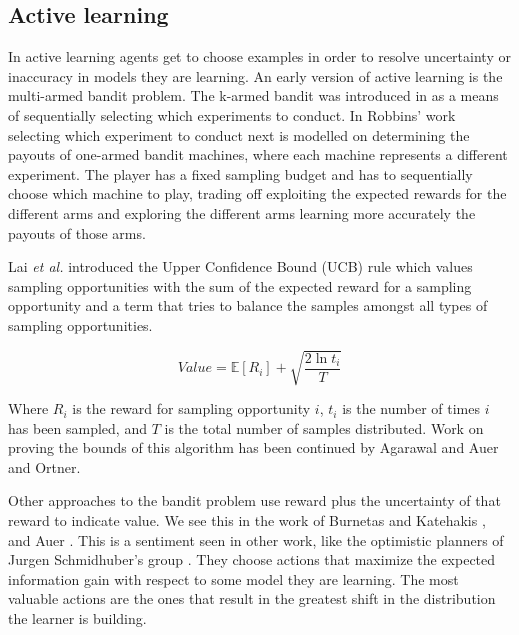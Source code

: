 \subsection{Active learning}

In active learning agents get to choose examples in order to resolve
uncertainty or inaccuracy in models they are learning.  An early version of
active learning is the multi-armed bandit problem.  The k-armed bandit was
introduced in \cite{robbins1952some} as a means of sequentially selecting which
experiments to conduct.  In Robbins' work \cite{robbins1952some} selecting which
experiment to conduct next is modelled on determining the payouts of one-armed
bandit machines, where each machine represents a different experiment.  The
player has a fixed sampling budget and has to sequentially choose which machine
to play, trading off exploiting the expected rewards for the different arms and
exploring the different arms learning more accurately the payouts of those
arms.  

Lai \emph{et al.} \cite{lai1985asymptotically} introduced the Upper Confidence
Bound (UCB) rule which values sampling opportunities with the sum of the expected reward for a sampling opportunity and a term that tries to balance the samples amongst all types of sampling opportunities.

$$
Value = \mathbb{E}\left[R_i\right] + \sqrt{\frac{2\ln t_i}{T}}
$$

Where $R_i$ is the reward for sampling opportunity $i$, $t_i$ is the number of times $i$ has been sampled, and $T$ is the total number of samples distributed.  Work on proving the bounds of this algorithm has been continued by Agarawal \cite{agrawal1995sample} and Auer and Ortner\cite{auer2010ucb}.  


Other approaches to the bandit problem use reward plus the uncertainty of that
reward to indicate value.  We see this in the work of Burnetas and Katehakis
\cite{burnetas1997optimal}, and Auer \cite{auer2003using}.  This is a sentiment
seen in other work, like the optimistic planners of Jurgen Schmidhuber's group
\cite{schmidhuber1997what,schmidhuber2003exploring,schmidhuber2009simple,sun2011planning}.
They choose actions that maximize the expected information gain with respect to
some model they are learning.  The most valuable actions are the ones that
result in the greatest shift in the distribution the learner is building.

